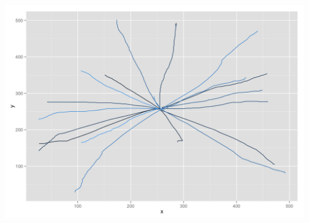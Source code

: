 \begin{appendices}
\begin{minipage}{\textwidth}
\begin{minipage}{0.5\linewidth}
	\end{minipage}
	\begin{minipage}{0.5\linewidth}
		\includegraphics[width=\linewidth]{images/plots/plot_analysis_qualitative_239}
	\end{minipage}	
	\label{fig:kvaliativ_persons_1}
\end{minipage}


\end{appendices}
